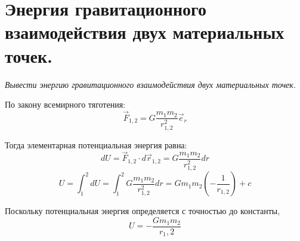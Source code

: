 \documentclass{article}
\begin{document}
   \section{Энергия гравитационного взаимодействия двух материальных точек.}
    \par
      \textit{Вывести энергию гравитационного взаимодействия двух материальных точек.}\\
    \par      
      По закону всемирного тяготения:
      \begin{equation}
	\vec F_{1,2} = G\frac{m_1m_2}{r_{1,2}^2}\vec e_r
      \end{equation}
    \par
      Тогда элементарная потенциальная энергия равна:
      \begin{equation}
	dU=\vec F_{1,2}\cdot d\vec r_{1,2}=G\frac{m_1m_2}{r_{1,2}^2}dr
      \end{equation}
      \begin{equation}
	U=\int^2_1 dU = \int^2_1 G\frac{m_1m_2}{r_{1,2}^2}dr = Gm_1m_2(-\frac{1}{r_{1,2}}) + c
      \end{equation}
    \par
      Поскольку потенциальная энергия определяется с точностью до константы,
      \begin{equation}
	U=-\frac{Gm_1m_2}{r_1,2}
      \end{equation}
  \clearpage
  
\end{document}
